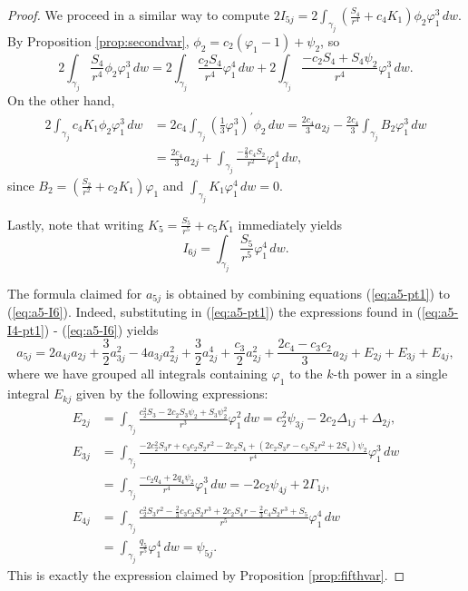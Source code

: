 \begin{proof}
We proceed in a similar way to compute $2I_{5j}=2\int_{\gamma_j}\left(\frac{S_4}{r^4}+c_4K_1\right)\phi_2\varphi_1^3\,dw$. By Proposition \ref{prop:secondvar}, $\phi_2=c_2(\varphi_1-1)+\psi_2$, so
\begin{equation}\label{eq:a5-I5-pt1}
2\int_{\gamma_j}\frac{S_4}{r^4}\phi_2\varphi_1^3\,dw=2\int_{\gamma_j}\frac{c_2S_4}{r^4}\varphi_1^4\,dw+2\int_{\gamma_j}\frac{-c_2S_4+S_4\psi_2}{r^4}\varphi_1^3\,dw. 
\end{equation}
On the other hand, 
\begin{align}\label{eq:a5-I5-pt2}
2\int_{\gamma_j}c_4K_1\phi_2\varphi_1^3\,dw	&= 2c_4\int_{\gamma_j}\left(\frac{1}{3}\varphi_1^3\right)^{\prime}\phi_2\,dw=\frac{2c_4}{3}a_{2j}-\frac{2c_4}{3}\int_{\gamma_j}B_2\varphi_1^3\,dw \nonumber \\
						&= \frac{2c_4}{3}a_{2j}+\int_{\gamma_j}\frac{-\frac{2}{3}c_4S_2}{r^2}\varphi_1^4\,dw, 
\end{align}
since $B_2=\left(\frac{S_2}{r^2}+c_2K_1\right)\varphi_1$ and $\int_{\gamma_j}K_1\varphi_1^4\,dw=0$.

Lastly, note that writing $K_5=\frac{S_5}{r^5}+c_5K_1$ immediately yields
\begin{equation}\label{eq:a5-I6}
I_{6j}=\int_{\gamma_j}\frac{S_5}{r^5}\varphi_1^4\,dw.
\end{equation}

The formula claimed for $a_{5j}$ is obtained by combining equations (\ref{eq:a5-pt1}) to (\ref{eq:a5-I6}). Indeed, substituting in (\ref{eq:a5-pt1}) the expressions found in (\ref{eq:a5-I4-pt1}) - (\ref{eq:a5-I6}) yields
\[ a_{5j}=2a_{4j}a_{2j}+\frac{3}{2}a_{3j}^2-4a_{3j}a_{2j}^2+\frac{3}{2}a_{2j}^4+ \frac{c_3}{2}a_{2j}^2+\frac{2c_4-c_3c_2}{3}a_{2j}+E_{2j}+E_{3j}+E_{4j}, \]
where we have grouped all integrals containing $\varphi_1$ to the $k$-th power in a single integral $E_{kj}$ given by the following expressions:
\begin{align*}
E_{2j}	&= \int_{\gamma_j}\frac{c_2^2S_3-2c_2S_3\psi_2+S_3\psi_2^2}{r^3}\varphi_1^2\,dw = c_2^2\psi_{3j}-2c_2\Delta_{1j}+\Delta_{2j}, \\[4pt]
E_{3j}	&= \int_{\gamma_j}\frac{-2c_2^2S_3r+c_3c_2S_2r^2-2c_2S_4+(2c_2S_3r-c_3S_2r^2+2S_4)\psi_2}{r^4}\varphi_1^3\,dw\\[4pt]
	&= \int_{\gamma_j}\frac{-c_2q_4+2q_4\psi_2}{r^4}\varphi_1^3\,dw = -2c_2\psi_{4j}+2\Gamma_{1j}, \\[4pt]
E_{4j}	&= \int_{\gamma_j}\frac{c_2^2S_3r^2-\frac{2}{3}c_3c_2S_2r^3+2c_2S_4r-\frac{2}{3}c_4S_2r^3+S_5}{r^5}\varphi_1^4\,dw\\[4pt]
	&= \int_{\gamma_j}\frac{q_5}{r^5}\varphi_1^4\,dw = \psi_{5j}.
\end{align*}
This is exactly the expression claimed by Proposition \ref{prop:fifthvar}. 
\end{proof}









